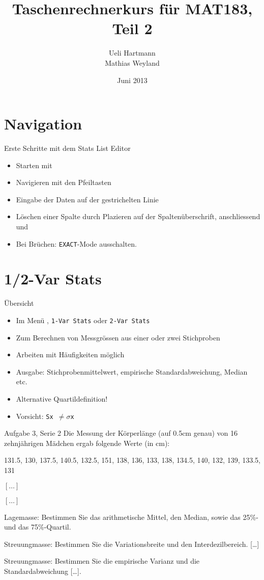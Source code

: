 \documentclass{beamer}
\title{Taschenrechnerkurs für MAT183, Teil 2}
\author{Ueli Hartmann\\Mathias Weyland}
\date{Juni 2013}
\newlength{\tikey}
\newcommand{\keystroke}[1]{\settowidth{\tikey}{\scriptsize #1}\psframebox[framearc=0.2]{\parbox{\tikey}{\scriptsize #1}}}
\begin{document}
\frame{\maketitle}


\section{Navigation}
\begin{frame}{Erste Schritte mit dem Stats List Editor}
\begin{itemize}
\item Starten mit \keystroke{APPS}
\item Navigieren mit den Pfeiltasten
\item Eingabe der Daten auf der gestrichelten Linie
\item Löschen einer Spalte durch Plazieren auf der Spaltenüberschrift, anschliessend \keystroke{CLEAR} und \keystroke{ENTER}
\item Bei Brüchen: \texttt{EXACT}-Mode ausschalten.
\end{itemize}
\end{frame}

\section{1/2-Var Stats}
\begin{frame}{Übersicht}
\begin{itemize}
\item Im Menü \keystroke{F4}, \texttt{1-Var Stats} oder \texttt{2-Var Stats}
\item Zum Berechnen von Messgrössen aus einer oder zwei Stichproben
\item Arbeiten mit Häufigkeiten möglich
\item Ausgabe: Stichprobenmittelwert, empirische Standardabweichung, Median etc.
\item Alternative Quartildefinition!
\item Vorsicht: \texttt{Sx $\ne\sigma$x}
\end{itemize}
\end{frame}

\begin{frame}{Aufgabe 3, Serie 2}
Die Messung der Körperlänge (auf 0.5cm genau) von 16 zehnjährigen Mädchen ergab
folgende Werte (in cm):

\begin{center}
131.5, 130, 137.5, 140.5, 132.5, 151, 138, 136, 133, 138, 134.5, 140, 132, 139, 133.5, 131
\end{center}
\begin{outline}
\item $[\dots]$
\item $[\dots]$
\item Lagemasse: Bestimmen Sie das arithmetische Mittel, den Median, sowie das 25\%-
und das 75\%-Quartil.
\item Streuungmasse: Bestimmen Sie die Variationsbreite und den Interdezilbereich. [\dots]
\item Streuungmasse: Bestimmen Sie die empirische Varianz und die Standardabweichung [\dots].
\end{outline}
\end{frame}
\end{document}
